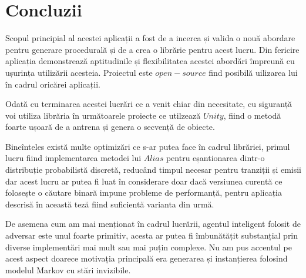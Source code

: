 \chapter*{Concluzii} 


Scopul principial al acestei aplicații a fost de a incerca și valida o nouă abordare pentru generare procedurală și de a crea o librărie pentru acest lucru. Din fericire aplicația demonstrează aptitudinile și flexibilitatea acestei abordări împreună cu ușurința utilizării acesteia. Proiectul este $open-source$ find posibilă uilizarea lui în cadrul oricărei aplicații.\par

Odată cu terminarea acestei lucrări ce a venit chiar din necesitate, cu siguranță voi utiliza librăria în următoarele proiecte ce utilzează $Unity$, fiind o metodă foarte ușoară de a antrena și genera o secvență de obiecte.\par

Bineînteles există multe optimizări ce s-ar putea face în cadrul librăriei, primul lucru fiind implementarea metodei lui $Alias$ pentru eșantionarea dintr-o distribuție probabilistă discretă, reducând timpul necesar pentru tranziții și emisii dar acest lucru ar putea fi luat în considerare doar dacă versiunea curentă ce folosește o căutare binară impune probleme de performanță, pentru aplicația descrisă în această teză fiind suficientă varianta din urmă.\par

De asemena cum am mai menționat în cadrul lucrării, agentul inteligent folosit de adversar este unul foarte primitiv, acesta ar putea fi îmbunătățit substanțial prin diverse implementări mai mult sau mai puțin complexe. Nu am pus accentul pe acest aspect doarece motivația principală era generarea și instanțierea folosind modelul Markov cu stări invizibile.\par
